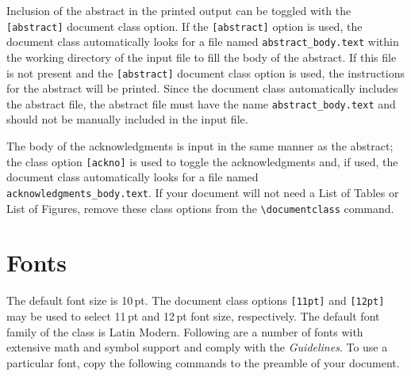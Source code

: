 \documentclass{wmu-thesis}
\begin{document}
Inclusion of the abstract in the printed output can be toggled with the \texttt{[abstract]} document class option.  If the \texttt{[abstract]} option is used, the document class automatically looks for a file named \verb|abstract_body.text| within the working directory of the input file to fill the body of the abstract.  If this file is not present and the \texttt{[abstract]} document class option is used, the instructions for the abstract will be printed.  Since the document class automatically includes the abstract file, the abstract file must have the name \verb|abstract_body.text| and should not be manually included in the input file.

The body of the acknowledgments is input in the same manner as the abstract; the class option \texttt{[ackno]} is used to toggle the acknowledgments and, if used, the document class automatically looks for a file named \verb|acknowledgments_body.text|.  If your document will not need a List of Tables or List of Figures, remove these class options from the \verb|\documentclass| command.

\section*{Fonts}
The default font size is 10\,pt.  The document class options \verb|[11pt]| and \verb|[12pt]| may be used to select 11\,pt and 12\,pt font size, respectively.  The default font family of the class is Latin Modern.  Following are a number of fonts with extensive math and symbol support and comply with the \textit{Guidelines}.  To use a particular font, copy the following commands to the preamble of your document.
\end{document}
